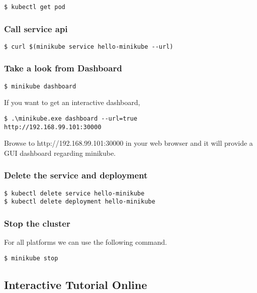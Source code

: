 \begin{verbatim}
$ kubectl get pod
\end{verbatim}

\subsubsection{Call service api}\label{call-service-api}

\begin{verbatim}
$ curl $(minikube service hello-minikube --url)
\end{verbatim}

\subsubsection{Take a look from
Dashboard}\label{take-a-look-from-dashboard}

\begin{verbatim}
$ minikube dashboard
\end{verbatim}

If you want to get an interactive dashboard,

\begin{verbatim}
$ .\minikube.exe dashboard --url=true
http://192.168.99.101:30000
\end{verbatim}

Browse to http://192.168.99.101:30000 in your web browser and it will
provide a GUI dashboard regarding minikube.

\subsubsection{Delete the service and
deployment}\label{delete-the-service-and-deployment}

\begin{verbatim}
$ kubectl delete service hello-minikube
$ kubectl delete deployment hello-minikube
\end{verbatim}

\subsubsection{Stop the cluster}\label{stop-the-cluster}

For all platforms we can use the following command.

\begin{verbatim}
$ minikube stop
\end{verbatim}

\subsection{Interactive Tutorial
Online}\label{interactive-tutorial-online}

